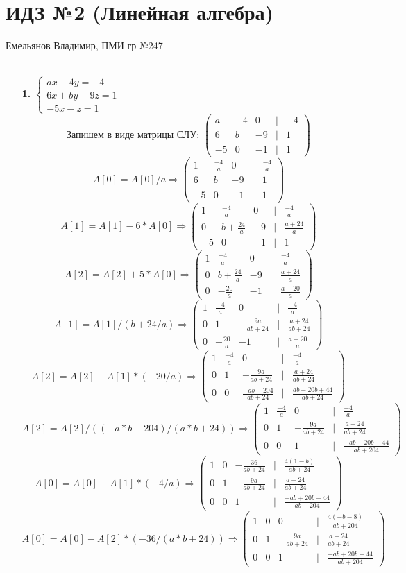 \documentclass[a4paper]{article}
\newcommand{\mat}[1]{\begin{pmatrix} #1 \end{pmatrix}}
\renewcommand{\f}[2]{\frac{#1}{#2}}
\newcommand{\case}[1]{\begin{cases} #1 \end{cases}}
\renewcommand{\r}{\Rightarrow}
\begin{document}
\section*{ИДЗ №2 (Линейная алгебра)}
{\large Емельянов Владимир, ПМИ гр №247}\\\\
\begin{enumerate}
    \item[\textbf{1.}]$\case{ax - 4y = -4\\
    6x+by-9z = 1 \\
    -5x-z=1}$\\
    $$\text{Запишем в виде матрицы СЛУ: }\mat{a & -4 & 0 & | & -4 \\ 6 & b & -9 & | & 1 \\ -5 & 0 & -1 & | & 1}$$
    $$A[0] = A[0]/a \r \mat{1 & \f{-4}{a} & 0 & | & \f{-4}{a} \\ 6 & b & -9 & | & 1 \\ -5 & 0 & -1 & | & 1}$$
    $$A[1] = A[1] - 6*A[0] \r \mat{1 & \f{-4}{a} & 0 & | & \f{-4}{a} \\ 0 & b + \f{24}{a} & -9 & | & \f{a + 24}{a} \\ -5 & 0 & -1 & | & 1}$$
    $$A[2] = A[2] + 5*A[0] \r \mat{1 & \f{-4}{a} & 0 & | & \f{-4}{a} \\ 0 & b + \f{24}{a} & -9 & | & \f{a + 24}{a} \\ 0 & -\f{20}{a} & -1 & | & \f{a - 20}{a}}$$
    $$A[1] = A[1]/(b+24/a) \r \mat{1 & \f{-4}{a} & 0 & | & \f{-4}{a} \\ 0 & 1 & -\f{9a}{a b + 24} & | & \f{a + 24}{a b + 24} \\ 0 & -\f{20}{a} & -1 & | & \f{a - 20}{a}}$$
    $$A[2] = A[2]-A[1]*(-20/a) \r \mat{1 & \f{-4}{a} & 0 & | & \f{-4}{a} \\ 0 & 1 & -\f{9a}{a b + 24} & | & \f{a + 24}{a b + 24} \\ 0 & 0 & \f{-a b - 204}{a b + 24} & | & \f{a b - 20 b + 44}{a b + 24}}$$
    $$A[2] = A[2]/((-a*b - 204)/(a*b + 24)) \r \mat{1 & \f{-4}{a} & 0 & | & \f{-4}{a} \\ 0 & 1 & -\f{9a}{a b + 24} & | & \f{a + 24}{a b + 24} \\ 0 & 0 & 1 & | & \f{-a b + 20 b - 44}{a b + 204}}$$
    $$A[0] = A[0]-A[1]*(-4/a) \r \mat{1 & 0 & -\f{36}{a b + 24} & | & \f{4(1 - b)}{a b + 24} \\ 0 & 1 & -\f{9a}{a b + 24} & | & \f{a + 24}{a b + 24} \\ 0 & 0 & 1 & | & \f{-a b + 20 b - 44}{a b + 204}}$$
    $$A[0] = A[0]-A[2]*(-36/(a*b + 24)) \r \mat{1 & 0 & 0 & | & \f{4(-b - 8)}{a b + 204} \\ 0 & 1 & -\f{9a}{a b + 24} & | & \f{a + 24}{a b + 24} \\ 0 & 0 & 1 & | & \f{-a b + 20 b - 44}{a b + 204}}$$

\end{enumerate}
\end{document}

